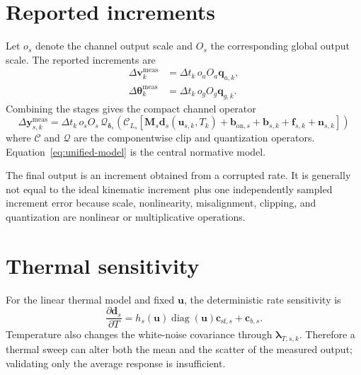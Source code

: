 \documentclass[11pt,oneside,headings=big]{scrreprt}
\newcommand{\diag}{\operatorname{diag}}
\newcommand{\vect}[1]{\bm{#1}}
\newcommand{\mat}[1]{\bm{#1}}
\begin{document}
    \section{Reported increments}
    Let \(o_s\) denote the channel output scale and \(O_s\) the corresponding global
     output scale. The reported increments are
    \begin{align}
        \Delta\vect v^{\mathrm{meas}}_k
        &=\Delta t_k\,o_aO_a\vect q_{a,k},\label{eq:reported-dv}\\
        \Delta\vect\theta^{\mathrm{meas}}_k
        &=\Delta t_k\,o_gO_g\vect q_{g,k}.
        \label{eq:reported-dtheta}
    \end{align}
    Combining the stages gives the compact channel operator
    \begin{equation}
        \boxed{
            \Delta\vect y^{\mathrm{meas}}_{s,k}
            =\Delta t_k\,o_sO_s\,
            \mathcal{Q}_{\vect\delta_s}\!\left(
                                             \mathcal{C}_{L_s}\!\left[
                                                                    \mat M_s\vect d_s(\vect u_{s,k},T_k)
                    +\vect b_{\mathrm{on},s}+\vect b_{s,k}+\vect f_{s,k}+\vect n_{s,k}
                \right]\right)
        }
        \label{eq:unified-model}
    \end{equation}
    where \(\mathcal{C}\) and \(\mathcal{Q}\) are the componentwise clip and
    quantization operators. Equation~\eqref{eq:unified-model} is the central
    normative model.

    \begin{implementationbox}
        The final output is an increment obtained from a corrupted rate. It is generally
        not equal to the ideal kinematic increment plus one independently sampled
        increment error because scale, nonlinearity, misalignment, clipping, and
        quantization are nonlinear or multiplicative operations.
    \end{implementationbox}


    \section{Thermal sensitivity}
    For the linear thermal model and fixed \(\vect u\), the deterministic rate
    sensitivity is
    \begin{equation}
        \frac{\partial\vect d_s}{\partial T}
        =h_s(\vect u)\diag(\vect u)\vect c_{\mathrm{sf},s}
        +\vect c_{b,s}.
        \label{eq:thermal-jacobian}
    \end{equation}
    Temperature also changes the white-noise covariance through
    \(\vect\lambda_{T,s,k}\). Therefore a thermal sweep can alter both the mean and
    the scatter of the measured output; validating only the average response is
    insufficient.
\end{document}
